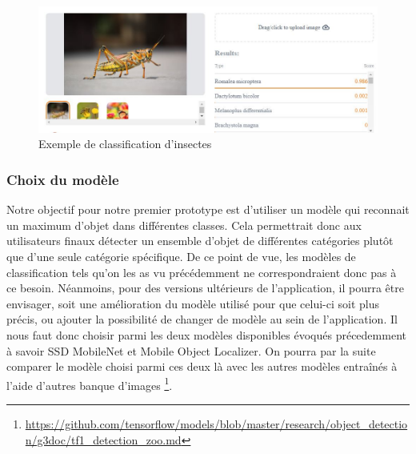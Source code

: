 \documentclass[UTF8]{EPURapport}
\begin{document}
\begin{figure}[h!]
\centering
  \includegraphics[width=\textwidth]{images/insects_classification.jpg}
  \caption{Exemple de classification d'insectes}
  \label{fig:insectsclassification}
\end{figure}

\subsubsection{Choix du modèle} \label{choixmodele}
Notre objectif pour notre premier prototype est d'utiliser un modèle qui reconnait un maximum d'objet dans différentes classes. Cela permettrait donc aux utilisateurs finaux détecter un ensemble d'objet de différentes catégories plutôt que d'une seule catégorie spécifique. De ce point de vue, les modèles de classification tels qu'on les as vu précédemment ne correspondraient donc pas à ce besoin. Néanmoins, pour des versions ultérieurs de l'application, il pourra être envisager, soit une amélioration du modèle utilisé pour que celui-ci soit plus précis, ou ajouter la possibilité de changer de modèle au sein de l'application. Il nous faut donc choisir parmi les deux modèles disponibles évoqués précedemment à savoir SSD MobileNet et Mobile Object Localizer. On pourra par la suite comparer le modèle choisi parmi ces deux là avec les autres modèles entraînés à l'aide d'autres banque d'images \footnote{\url{https://github.com/tensorflow/models/blob/master/research/object_detection/g3doc/tf1_detection_zoo.md}}. \\
\end{document}
